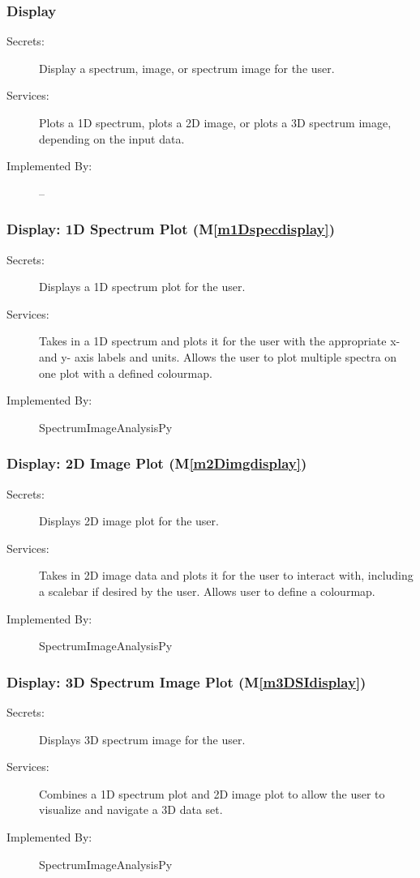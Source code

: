 \documentclass[12pt, titlepage]{article}
\newcommand{\mref}[1]{M\ref{#1}}
\newcommand{\progname}{SpectrumImageAnalysisPy}
\begin{document}
\subsubsection{Display}
\begin{description}
	\item[Secrets:]Display a spectrum, image, or spectrum image for the user.
	\item[Services:]Plots a 1D spectrum, plots a 2D image, or plots a 3D spectrum
image, depending on the input data. 
	\item[Implemented By:] --
\end{description}

\subsubsection{Display: 1D Spectrum Plot (\mref{m1Dspecdisplay})}
\begin{description}
	\item[Secrets:]Displays a 1D spectrum plot for the user.
	\item[Services:]Takes in a 1D spectrum and plots it for the user with the
appropriate x- and y- axis labels and units. Allows the user to plot multiple
spectra on one plot with a defined colourmap.
	\item[Implemented By:] \progname
\end{description}

\subsubsection{Display: 2D Image Plot (\mref{m2Dimgdisplay})}
\begin{description}
	\item[Secrets:]Displays 2D image plot for the user.
	\item[Services:]Takes in 2D image data and plots it for the user to interact
with, including a scalebar if desired by the user. Allows user to define a
colourmap. 
	\item[Implemented By:] \progname
\end{description}

\subsubsection{Display: 3D Spectrum Image Plot (\mref{m3DSIdisplay})}
\begin{description}
	\item[Secrets:]Displays 3D spectrum image for the user.
	\item[Services:]Combines a 1D spectrum plot and 2D image plot to allow the user
to visualize and navigate a 3D data set. 
	\item[Implemented By:] \progname
\end{description}
\end{document}
